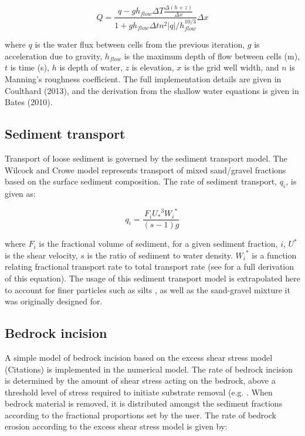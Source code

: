 \documentclass[12pt,oneside,PhD]{muthesis}
\begin{document}
\begin{equation}
Q = \frac{q - g h_{flow} \Delta T \frac{\Delta (h+z) }{\Delta x}}{1 + g h_{flow} \Delta t n^2 |q| / h_{flow}^{10/3}} \Delta x
\end{equation}

where \(q\) is the water flux between cells from the previous iteration, \(g\) is acceleration due to gravity, \(h_{flow}\) is the maximum depth of flow between cells (m), \(t\) is time (s), \(h\) is depth of water, \(z\) is elevation, \(x\) is the grid well width, and \(n\) is Manning's roughness coefficient. The full implementation details are given in Coulthard (2013), and the derivation from the shallow water equations is given in Bates (2010).

\subsection{Sediment transport}
Transport of loose sediment is governed by the \citet{Wilcock2003} sediment transport model. The Wilcock and Crowe model represents transport of mixed sand/gravel fractions based on the surface sediment composition. The rate of sediment transport, \(q_i\), is given as:

\begin{equation}
q_i = \frac{F_i {U_*}^3 {W_i}^*}{(s -1) g}
\end{equation}

where \(F_i\) is the fractional volume of sediment, for a given sediment fraction, \(i\), \(U^*\) is the shear velocity, \(s\) is the ratio of sediment to water density. \({W_i}^*\) is a function relating fractional transport rate to total transport rate (see \citet{Wilcock2003} for a full derivation of this equation). The usage of this sediment transport model is extrapolated here to account for finer particles such as silts \citep{Vandewiel2007}, as well as the sand-gravel mixture it was originally designed for.

\subsection{Bedrock incision}
\label{bedrock_model}
A simple model of bedrock incision based on the excess shear stress model (Citations) is implemented in the numerical model. The rate of bedrock incision is determined by the amount of shear stress acting on the bedrock, above a threshold level of stress required to initiate substrate removal (e.g. \citet{Snyder2003}. When bedrock material is removed, it is distributed amongst the sediment fractions according to the fractional proportions set by the user. The rate of bedrock erosion according to the excess shear stress model is given by:
\end{document}
